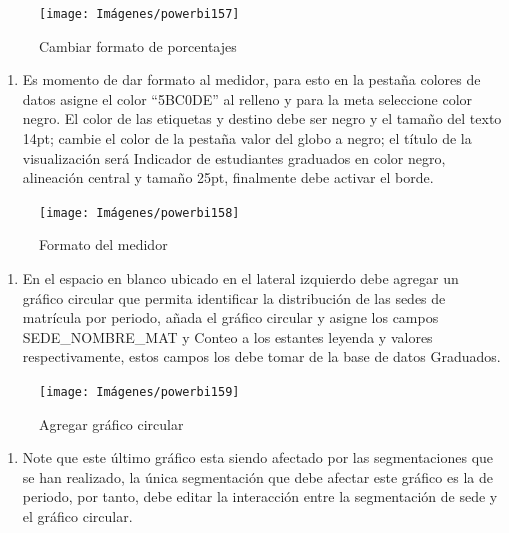 \documentclass[
]{book}
\providecommand{\tightlist}{%
  \setlength{\itemsep}{0pt}\setlength{\parskip}{0pt}}
\begin{document}
\begin{figure}

{\centering \texttt{[image: Imágenes/powerbi157]} 

}

\caption{Cambiar formato de porcentajes}\label{fig:paso6medidor-fig}
\end{figure}

\begin{enumerate}
\def\labelenumi{\arabic{enumi}.}
\setcounter{enumi}{6}
\tightlist
\item
  Es momento de dar formato al medidor, para esto en la pestaña colores de datos asigne el color ``5BC0DE'' al relleno y para la meta seleccione color negro. El color de las etiquetas y destino debe ser negro y el tamaño del texto 14pt; cambie el color de la pestaña valor del globo a negro; el título de la visualización será Indicador de estudiantes graduados en color negro, alineación central y tamaño 25pt, finalmente debe activar el borde.
\end{enumerate}

\begin{figure}

{\centering \texttt{[image: Imágenes/powerbi158]} 

}

\caption{Formato del medidor}\label{fig:paso7medidor-fig}
\end{figure}

\begin{enumerate}
\def\labelenumi{\arabic{enumi}.}
\setcounter{enumi}{7}
\tightlist
\item
  En el espacio en blanco ubicado en el lateral izquierdo debe agregar un gráfico circular que permita identificar la distribución de las sedes de matrícula por periodo, añada el gráfico circular y asigne los campos SEDE\_NOMBRE\_MAT y Conteo a los estantes leyenda y valores respectivamente, estos campos los debe tomar de la base de datos Graduados.
\end{enumerate}

\begin{figure}

{\centering \texttt{[image: Imágenes/powerbi159]} 

}

\caption{Agregar gráfico circular}\label{fig:paso8medidor-fig}
\end{figure}

\begin{enumerate}
\def\labelenumi{\arabic{enumi}.}
\setcounter{enumi}{8}
\tightlist
\item
  Note que este último gráfico esta siendo afectado por las segmentaciones que se han realizado, la única segmentación que debe afectar este gráfico es la de periodo, por tanto, debe editar la interacción entre la segmentación de sede y el gráfico circular.
\end{enumerate}
\end{document}

